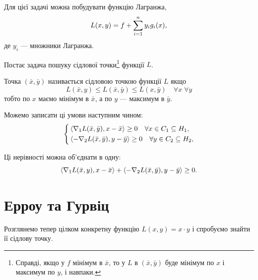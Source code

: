 Для цієї задачі можна побудувати функцію Лагранжа,
\begin{equation}
    L (x, y) = f + \Sum_{i = 1}^n y_i g_i(x),
\end{equation}
де $y_i$ --- множники Лагранжа. \medskip

Постає задача пошуку сідлової точки\footnote{Справді, якщо у $f$ мінімум в $\bar x$, то у $L$ в $(\bar x, \bar y)$ буде мінімум по $x$ і максимум по $y$, і навпаки.} функції $L$. 

\begin{definition}
    Точка $(\bar x, \bar y)$ називається сідловою точкою функції $L$ якщо
    \begin{equation}
        L(\bar x, y) \le L(\bar x, \bar y) \le L(x, \bar y) \quad \forall x \; \forall y
    \end{equation}
    тобто по $x$ маємо мінімум в $\bar x$, а по $y$ --- максимум в $\bar y$.
\end{definition}

Можемо записати ці умови наступним чином:
\begin{equation}
    \left\{
        \begin{aligned}
            & \sp{\nabla_1 L(\bar x, \bar y), x - \bar x} \ge 0 \quad \forall x \in C_1 \subseteq H_1, \\
            & \sp{-\nabla_2 L(\bar x, \bar y), y - \bar y} \ge 0 \quad \forall y \in C_2 \subseteq H_2,
        \end{aligned}
    \right. 
\end{equation}

\begin{remark}
    Ці нерівності можна об'єднати в одну:
    \begin{equation}
        \sp{\nabla_1 L(\bar x, y), x - \bar x} + \sp{-\nabla_2 L(\bar x, \bar y), y - \bar y} \ge 0.
    \end{equation}
\end{remark}

\section{Ерроу та Гурвіц}

\begin{example}
    Розглянемо тепер цілком конкретну функцію $L(x, y) = x \cdot y$ і спробуємо знайти її сідлову точку.
\end{example}

